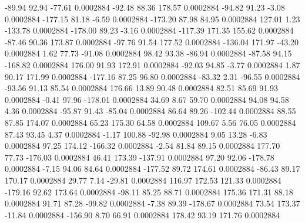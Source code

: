       -89.94       92.94      -77.61     0.0002884
      -92.48       88.36      178.57     0.0002884
      -94.82       91.23       -3.08     0.0002884
     -177.15       81.18       -6.59     0.0002884
     -173.20       87.98       84.95     0.0002884
      127.01        1.23     -133.78     0.0002884
     -178.00       89.23       -3.16     0.0002884
     -117.39      171.35      155.62     0.0002884
      -87.46       90.36      173.87     0.0002884
      -97.76       91.54      177.52     0.0002884
     -136.04      171.97      -43.20     0.0002884
        1.62       77.73      -91.08     0.0002884
       98.42       93.38      -86.94     0.0002884
      -87.58       94.15     -168.82     0.0002884
      176.00       91.93      172.91     0.0002884
      -92.03       94.85       -3.77     0.0002884
        1.87       90.17      171.99     0.0002884
     -177.16       87.25       96.80     0.0002884
      -83.32        2.31      -96.55     0.0002884
      -93.56       91.13       85.54     0.0002884
      176.66       13.89       90.48     0.0002884
       82.51       85.69       91.93     0.0002884
       -0.41       97.96     -178.01     0.0002884
       34.69        8.67       59.70     0.0002884
       94.08       94.58        4.36     0.0002884
      -95.87       91.43      -85.04     0.0002884
       86.64       89.26     -102.44     0.0002884
       88.55       87.85      174.07     0.0002884
       65.23      175.30       64.58     0.0002884
      109.67        5.56       76.05     0.0002884
       87.43       93.45        4.37     0.0002884
       -1.17      100.88      -92.98     0.0002884
        9.05       13.28       -6.83     0.0002884
       97.25      174.12     -166.32     0.0002884
       -2.54       81.84       89.15     0.0002884
      177.70       77.73     -176.03     0.0002884
       46.41      173.39     -137.91     0.0002884
       97.20       92.06     -178.78     0.0002884
       -7.15       94.06       84.64     0.0002884
     -177.52       89.72      174.61     0.0002884
      -86.43       89.17      170.17     0.0002884
       29.77        7.14      -29.81     0.0002884
      116.97      172.53      121.33     0.0002884
     -179.16       92.62      173.64     0.0002884
      -98.11       85.25       88.71     0.0002884
      175.36      171.31       88.18     0.0002884
       91.71       87.28      -99.82     0.0002884
       -7.38       89.39     -178.67     0.0002884
       73.54      173.37      -11.84     0.0002884
     -156.90        8.70       66.91     0.0002884
      178.42       93.19      171.76     0.0002884

